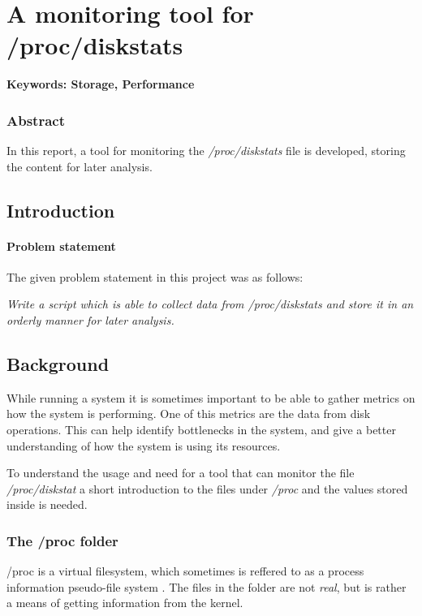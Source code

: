\chapter{A monitoring tool for /proc/diskstats}
\textbf{Keywords: Storage, Performance}

\subsection*{Abstract}
In this report, a tool for monitoring the \textit{/proc/diskstats} file is
developed, storing the content for later analysis.

\section{Introduction}

\subsubsection{Problem statement}

The given problem statement in this project was as follows:

\emph{Write a script which is able to collect data from /proc/diskstats and store 
it in an orderly manner for later analysis.}

\section{Background}
While running a system it is sometimes important to be able to gather metrics
on how the system is performing. One of this metrics are the data from disk
operations. This can help identify bottlenecks in the system, and give a better
understanding of how the system is using its resources.

To understand the usage and need for a tool that can monitor the file
\textit{/proc/diskstat} a short introduction to the files under \textit{/proc}
and the values stored inside is needed.

\subsection{The /proc folder}
/proc is a virtual filesystem, which sometimes is reffered to as a process
information pseudo-file system \cite{tldp:proc}. The files in the folder are
not \textit{real}, but is rather a means of getting information from the
kernel.

